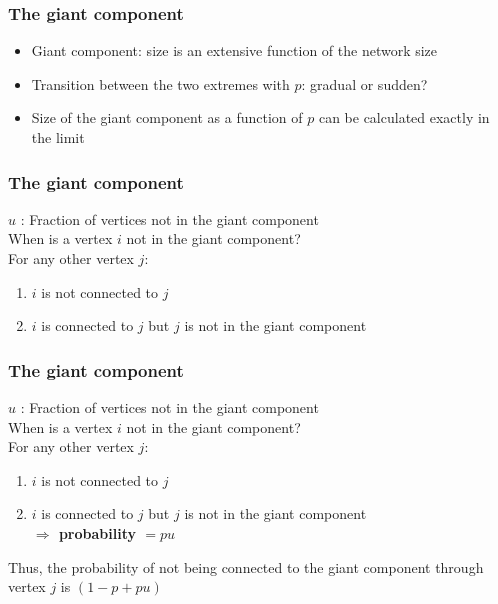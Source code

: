 \documentclass{beamer}
\begin{document}
\begin{frame}
    \frametitle{The giant component}
    \centering
    \begin{itemize}
        \setlength\itemsep{1em}
        \item{Giant component: size is an extensive function of the network size}
        \item{Transition between the two extremes with $p$: gradual or sudden?}
        \item{Size of the giant component as a function of $p$ can be calculated exactly in the limit}
    \end{itemize}
\end{frame}
\begin{frame}
    \frametitle{The giant component}
    $u$ : Fraction of vertices not in the giant component\\

    \justifying
    \vspace{1em}
    When is a vertex $i$ not in the giant component?\\

    \vspace{1em}
    For any other vertex $j$:
    \begin{enumerate}
        \setlength\itemsep{1em}
        \item{$i$ is not connected to $j$}
        \item{$i$ is connected to $j$ but $j$ is not in the giant component}
    \end{enumerate}
\end{frame}
\begin{frame}
    \frametitle{The giant component}
    $u$ : Fraction of vertices not in the giant component\\

    \justifying
    \vspace{1em}
    When is a vertex $i$ not in the giant component?\\

    \vspace{1em}
    For any other vertex $j$:
    \begin{enumerate}
        \setlength\itemsep{1em}
        \item{$i$ is not connected to $j$ }
        \item{$i$ is connected to $j$ but $j$ is not in the giant component \\{\bf $\Rightarrow$ probability $=pu$}}
    \end{enumerate}
    \vspace{1em}
    Thus, the probability of not being connected to the giant component through vertex $j$ is $(1-p+pu)$
\end{frame}
\end{document}
